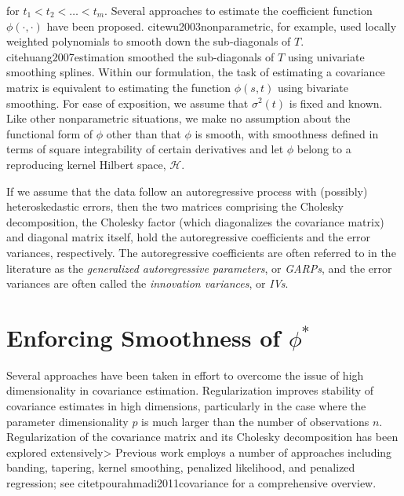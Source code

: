 \documentclass[12pt]{article}
\theoremstyle{definition}
\begin{document}
\noindent for $t_1 < t_2 < \dots < t_m$. Several approaches to estimate the coefficient function $\phi\left(\cdot,\cdot\right)$ have been proposed. cite{wu2003nonparametric}, for example, used locally weighted polynomials to smooth down the sub-diagonals of $T$. cite{huang2007estimation} smoothed the sub-diagonals of $T$ using univariate smoothing splines.  Within our formulation, the task of estimating a covariance matrix is equivalent to estimating the function $\phi\left(s,t\right)$ using bivariate smoothing. For ease of exposition, we assume that $\sigma^2\left(t\right)$ is fixed and known. Like other nonparametric situations, we make no assumption about the functional form of $\phi$ other than that $\phi$ is smooth, with smoothness defined in terms of square integrability of certain derivatives and let $\phi$ belong to a reproducing kernel Hilbert space, $\mathcal{H}$.



 

If we assume that the data follow an autoregressive process with (possibly) heteroskedastic errors, then the two matrices comprising the Cholesky decomposition, the Cholesky factor (which diagonalizes the covariance matrix) and diagonal matrix itself, hold the autoregressive coefficients and the error variances, respectively. The autoregressive coefficients are often referred to in the literature as the \emph{generalized autoregressive parameters}, or \emph{GARPs}, and the error variances are often called the \emph{innovation variances}, or \emph{IVs}.

\section{Enforcing Smoothness of $\phi^*$}

Several approaches have been taken in effort to overcome the issue of high dimensionality in covariance estimation. Regularization improves stability of covariance estimates in high dimensions, particularly in the case where the parameter dimensionality $p$ is much larger than the number of observations $n$.  Regularization of the covariance matrix and its Cholesky decomposition has been explored extensively> Previous work employs a number of approaches including banding, tapering, kernel smoothing, penalized likelihood, and penalized regression; see citet{pourahmadi2011covariance} for a comprehensive overview.
\end{document}
